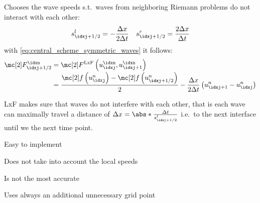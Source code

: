 \begin{defnbox}\nospacing
    \begin{defn}\label{defn:lax_friedrichs_scheme}
        Chooses the wave speeds s.t.\ waves from neighboring Riemann problems do not interact with each other:
        \begin{align}
          s_{\idxj+1/2}^{l}=-\frac{\Delta x}{2\Delta t}&&s_{\idxj+1/2}^{r}=\frac{2\Delta x}{\Delta t}
        \end{align}
        with \cref{eq:central_scheme_symmetric_waves} it follows:
        \begin{align}
          \Flux_{\idxj+1/2}^{\idxn}&=\Flux^{\text{LxF}}\left(u^{\idxn}_{\idxj},u^{\idxn}_{\idxj+1}\right)\\[-1\jot]
          &=\frac{\flux\left(u_{\idxj}^{n}\right)-\flux \left(u_{\idxj+1/2}^{n}\right)}{2}-\frac{\Delta x}{2\Delta t}\left(u_{\idxj+1}^{n}-u_{\idxj}^{n}\right)\nonumber
        \end{align}
    \end{defn}
\end{defnbox}
\begin{explanationbox}\nospacing
    \begin{explanation}
        LxF makes sure that waves do not interfere with each other, that is each wave can maximally travel a distance of $\Delta x=\abs*{\frac{\Delta t}{s_{\idxj+1/2}^{l}}}$ i.e.\ to the next interface until we the next time point.
    \end{explanation}
\end{explanationbox}
\begin{sectionbox}\nospacing
    \begin{minipage}[t]{0.4\textwidth}
       \begin{proslist}
           \item Easy to implement
       \end{proslist}
    \end{minipage}
    \begin{minipage}[t]{0.55\textwidth}
       \begin{conslist}
           \item Does not take into account the local speeds
           \item Is not the most accurate
           \item Uses always an additional unnecessary grid point
       \end{conslist}
    \end{minipage}
\end{sectionbox}

